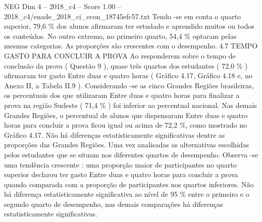 \begin{textsample}{NEG Dim 4 – 2018\_c4 – Score 1.00 – 2018\_c4/enade\_2018\_ci\_econ\_18745efc57.txt}
Tendo -se em conta o quarto superior, 79,6 \% dos alunos afirmaram ter estudado e aprendido muitos ou todos os conteúdos.
No outro extremo, no primeiro quarto, 54,4 \% optaram pelas mesmas categorias.
As proporções são crescentes com o desempenho. 4.7 TEMPO GASTO PARA CONCLUIR A PROVA Ao responderem sobre o tempo de conclusão da prova ( Questão 9 ), quase três quartos dos estudantes ( 72,0 \% ) afirmaram ter gasto Entre duas e quatro horas ( Gráfico 4.17, Gráfico 4.18 e, no Anexo II, a Tabela II.9 ).
Considerando -se as cinco Grandes Regiões brasileiras, os percentuais dos que utilizaram Entre duas e quatro horas para finalizar a prova na região Sudeste ( 71,4 \% ) foi inferior ao percentual nacional.
Nas demais Grandes Regiões, o percentual de alunos que dispensaram Entre duas e quatro horas para concluir a prova ficou igual ou acima de 72,2 \%, como mostrado no Gráfico 4.17.
Não há diferenças estatisticamente significativas dentre as proporções das Grandes Regiões.
Uma vez analisadas as alternativas escolhidas pelos estudantes que se situam nos diferentes quartos de desempenho.
Observa -se uma tendência crescente : uma proporção maior de participantes no quarto superior declarou ter gasto Entre duas e quatro horas para concluir a prova quando comparada com a proporção de participantes nos quartos inferiores.
Não há diferença estatisticamente significativa ao nível de 95 \% entre o primeiro e o segundo quarto de desempenho, nas demais comparações há diferenças estatisticamente significativas.

\end{textsample}
